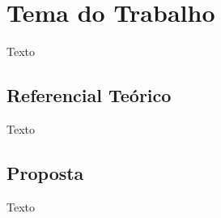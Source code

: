 \chapter{Tema do Trabalho}

Texto

\section{Referencial Teórico}

Texto

\section{Proposta}

Texto

